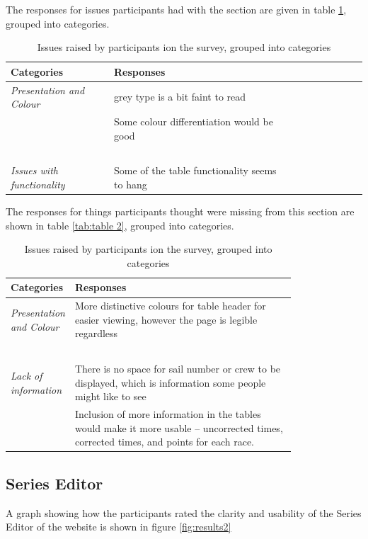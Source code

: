 \documentclass{l4proj}
\begin{document}
The responses for issues participants had with the section are given in table \ref{tab:table 1}, grouped into categories.

\begin{table}[!ht]
    \centering
    \caption{Issues raised by participants ion the survey, grouped into categories}
    \begin{tabular}{|l|l|l|l|l|l|l|l|l|l|}
    \hline
        \textbf{Categories} & \textbf{Responses}  \\ \hline
        \textit{Presentation and Colour} & grey type is a bit faint to read  \\ \hline
        ~ & Some colour differentiation would be good  \\ \hline
        ~ & ~ \\ \hline
        \textit{Issues with functionality} & Some of the table functionality seems to hang  \\ \hline
    \end{tabular}
    \label{tab:table 1}
\end{table}

The responses for things participants thought were missing from this section are shown in table \ref{tab:table 2}, grouped into categories.

\begin{table}[H]
    \centering
    \caption{Issues raised by participants ion the survey, grouped into categories}
    \begin{tabular}{|l|p{0.8\linewidth}|}
    \hline
        \textbf{Categories} & \textbf{Responses}  \\ \hline
        \textit{Presentation and Colour} & More distinctive colours for table header for easier viewing, however the page is legible regardless  \\ \hline
        ~ & ~ \\ \hline
        \textit{Lack of information} & There is no space for sail number or crew to be displayed, which is information some people might like to see  \\ \hline
        ~ & Inclusion of more information in the tables would make it more usable -- uncorrected times, corrected times, and points for each race.  \\ \hline
    \end{tabular}
    \label{tab:table 1a}
\end{table}

\subsection{Series Editor}
A graph showing how the participants rated the clarity and usability of the Series Editor of the website is shown in figure \ref{fig:results2}
\end{document}
